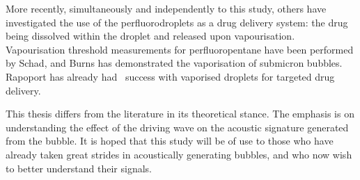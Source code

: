More recently, simultaneously and independently to this study,
others have investigated the use of the perfluorodroplets as a drug delivery system:
the drug being dissolved within the droplet and released upon vapourisation\cite{Fabiilli2010}.
Vapourisation threshold measurements for perfluoropentane have been performed by Schad\cite{Schad2009},
and Burns\cite{Burns2010} has demonstrated the vaporisation of submicron bubbles.
Rapoport\cite{Rapoport2007} has already had \invivo\ success with vaporised droplets for targeted drug delivery.


This thesis differs from the literature in its theoretical stance.
The emphasis is on understanding the effect of the driving wave 
on the acoustic signature generated from the bubble.
It is hoped that this study will be of use 
to those who have already taken great strides in acoustically generating bubbles,
and who now wish to better understand their signals.














